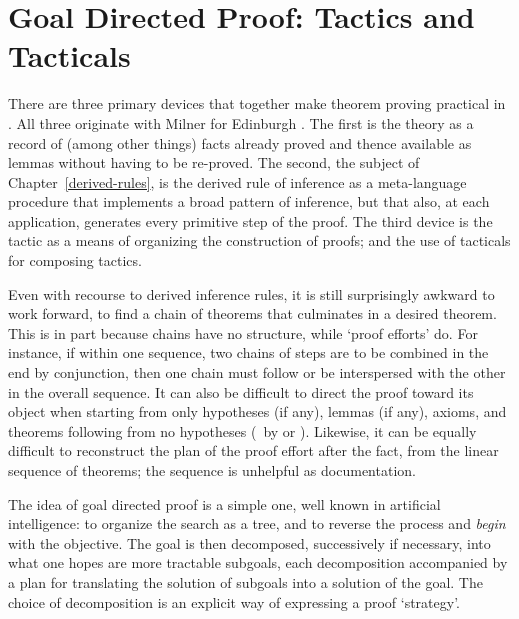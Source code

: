 \chapter{Goal Directed Proof: Tactics and Tacticals}

\label{tactics-and-tacticals}

There are three primary devices that together make theorem proving practical
in \HOL. All three originate with Milner
%
%
for Edinburgh \LCF.
The first is the theory as
a record of (among other things) facts already proved
and thence available as lemmas
without having to be re-proved.  The second,
the subject of Chapter~\ref{derived-rules}, is the
derived rule of inference as a meta-language procedure that implements a
broad pattern of inference, but that also, at each application,
generates every primitive step of the proof. The third device is
the tactic as a means of organizing the construction of proofs;
and the use of tacticals for composing tactics.

Even with recourse to derived inference rules,
it is still surprisingly awkward to work forward,
 to find a chain of
theorems that culminates in a desired theorem.  This is in part because
chains have no structure, while `proof efforts' do.  For instance, if
within one sequence, two chains of steps
are to be combined in the end by conjunction, then
one chain must follow or be interspersed with
the other in the overall sequence.  It can also be difficult to direct
the proof toward its object when starting from
only hypotheses (if any), lemmas (if any),
axioms, and theorems following from no hypotheses
(\eg\ by  or ). Likewise, it can be equally difficult
to reconstruct
the plan of the proof effort after the fact, from the
linear sequence of theorems; the sequence is unhelpful as documentation.

The idea of goal directed proof is a simple one, well known in
artificial intelligence: to organize the search as a tree, and to reverse
the process and {\it begin\/} with the objective. The goal is then
decomposed, successively if necessary,
into what one hopes are more tractable subgoals, each decomposition
accompanied by a
plan for translating the solution of subgoals into a solution of the goal.
The choice of decomposition is an explicit way of expressing a proof
`strategy'.

